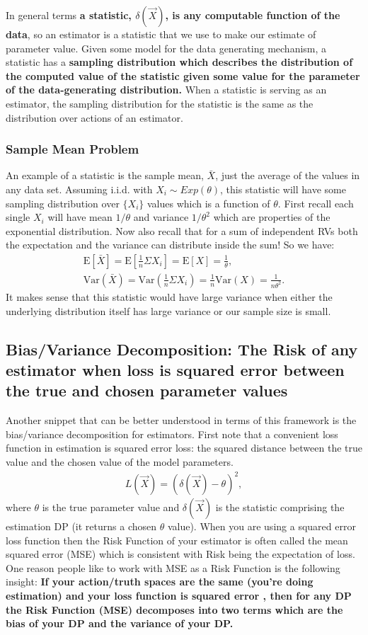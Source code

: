 In general terms \textbf{a statistic, $\delta(\vec{X})$, is any computable function of the data}, so an estimator is a statistic that we use to make our estimate of parameter value. Given some model for the data generating mechanism, a statistic has a \textbf{sampling distribution which describes the distribution of the computed value of the statistic given some value for the parameter of the data-generating distribution.} When a statistic is serving as an estimator, the sampling distribution for the statistic is the same as the distribution over actions of an estimator. 
\n

\subsubsection{Sample Mean Problem}
An example of a statistic is the sample mean, $\bar{X}$, just the average of the values in any data set. Assuming i.i.d. with $X_i \sim Exp(\theta)$, this statistic will have some sampling distribution over $\{X_i\}$ values which is a function of $\theta$. First recall each single $X_i$ will have mean $1/\theta$ and variance $1/\theta^2$ which are properties of the exponential distribution. Now also recall that for a sum of independent RVs both the expectation and the variance can distribute inside the sum! So we have:
\begin{align*}
\mathrm{E}[\bar{X}] = \mathrm{E}[\frac{1}{n}\Sigma X_i] = \mathrm{E}[X] = \frac{1}{\theta},\\
\mathrm{Var}(\bar{X}) = \mathrm{Var}(\frac{1}{n}\Sigma X_i) = \frac{1}{n} \mathrm{Var}(X) = \frac{1}{n\theta^2}.
\end{align*}
It makes sense that this statistic would have large variance when either the underlying distribution itself has large variance or our sample size is small.


\subsection{Bias/Variance Decomposition: The Risk of any estimator when loss is squared error between the true and chosen parameter values}
Another snippet that can be better understood in terms of this framework is the bias/variance decomposition for estimators. First note that a convenient loss function in estimation is squared error loss: the squared distance between the true value and the chosen value of the model parameters. 
\begin{align*}
L(\vec{X}) = (\delta(\vec{X})-\theta)^2,
\end{align*}
where $\theta$ is the true parameter value and $\delta(\vec{X})$ is the statistic comprising the estimation DP (it returns a chosen $\theta$ value). When you are using a squared error loss function then the Risk Function of your estimator is often called the mean squared error (MSE) which is consistent with Risk being the expectation of loss. One reason people like to work with MSE as a Risk Function is the following insight: \textbf{If your action/truth spaces are the same (you're doing estimation) and your loss function is squared error , then for any DP the Risk Function (MSE) decomposes into two terms which are the bias of your DP and the variance of your DP.} 
\n

